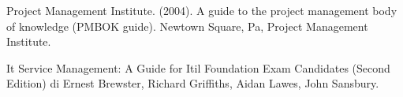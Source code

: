 \documentclass[conference]{IEEEtran}
\begin{document}
\begin{thebibliography}{1}

Project Management Institute. (2004). A guide to the project management body of knowledge (PMBOK guide). Newtown Square, Pa, Project Management Institute.

It Service Management: A Guide for Itil Foundation Exam Candidates (Second Edition) di Ernest Brewster, Richard Griffiths, Aidan Lawes, John Sansbury.


\end{thebibliography}




\end{document}
